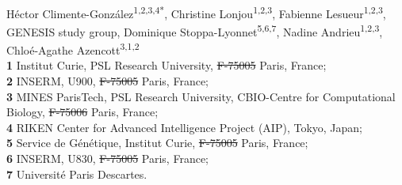 \documentclass[10pt,letterpaper]{article}
\providecommand{\DIFaddtex}[1]{{\protect\color{blue}\uwave{#1}}} %
\providecommand{\DIFdeltex}[1]{{\protect\color{red}\sout{#1}}}                      %
\providecommand{\DIFaddbegin}{} %
\providecommand{\DIFaddend}{} %
\providecommand{\DIFdelbegin}{} %
\providecommand{\DIFdelend}{} %
\providecommand{\DIFadd}[1]{\texorpdfstring{\DIFaddtex{#1}}{#1}} %
\providecommand{\DIFdel}[1]{\texorpdfstring{\DIFdeltex{#1}}{}} %
\newcommand{\DIFscaledelfig}{0.5}
\newlength{\DIFdelgraphicswidth} %
\newlength{\DIFdelgraphicsheight} %
\newcommand{\DIFaddincludegraphics}[2][]{{\color{blue}\fbox{\DIFOincludegraphics[#1]{#2}}}} %
\newcommand{\DIFdelincludegraphics}[2][]{%
\sbox{\DIFdelgraphicsbox}{\DIFOincludegraphics[#1]{#2}}%
\settoboxwidth{\DIFdelgraphicswidth}{\DIFdelgraphicsbox} %
\settoboxtotalheight{\DIFdelgraphicsheight}{\DIFdelgraphicsbox} %
\scalebox{\DIFscaledelfig}{%
\parbox[b]{\DIFdelgraphicswidth}{\usebox{\DIFdelgraphicsbox}\\[-\baselineskip] \rule{\DIFdelgraphicswidth}{0em}}\llap{\resizebox{\DIFdelgraphicswidth}{\DIFdelgraphicsheight}{%
\setlength{\unitlength}{\DIFdelgraphicswidth}%
\begin{picture}(1,1)%
\thicklines\linethickness{2pt} %
{\color[rgb]{1,0,0}\put(0,0){\framebox(1,1){}}}%
{\color[rgb]{1,0,0}\put(0,0){\line( 1,1){1}}}%
{\color[rgb]{1,0,0}\put(0,1){\line(1,-1){1}}}%
\end{picture}%
}\hspace*{3pt}}} %
} %
\DeclareRobustCommand{\DIFaddbegin}{\DIFOaddbegin \let\includegraphics\DIFaddincludegraphics} %
\DeclareRobustCommand{\DIFaddend}{\DIFOaddend \let\includegraphics\DIFOincludegraphics} %
\DeclareRobustCommand{\DIFdelbegin}{\DIFOdelbegin \let\includegraphics\DIFdelincludegraphics} %
\DeclareRobustCommand{\DIFdelend}{\DIFOaddend \let\includegraphics\DIFOincludegraphics} %
\begin{document}
\vspace*{0.2in}

\begin{flushleft}
{\Large
\textbf{} %
}
\newline
\\
Héctor Climente-González\textsuperscript{1,2,3,4*}, 
Christine Lonjou\textsuperscript{1,2,3}, 
Fabienne Lesueur\textsuperscript{1,2,3},
GENESIS study group\textsuperscript{\textpilcrow},
Dominique Stoppa-Lyonnet\textsuperscript{5,6,7\textcurrency}, 
Nadine Andrieu\textsuperscript{1,2,3}, 
Chloé-Agathe Azencott\textsuperscript{3,1,2}
\\
\bigskip
\textbf{1} Institut Curie, PSL Research University, \DIFdelbegin \DIFdel{F-75005 }\DIFdelend Paris, France;\\
\textbf{2} INSERM, U900, \DIFdelbegin \DIFdel{F-75005 }\DIFdelend Paris, France;\\
\textbf{3} MINES ParisTech, PSL Research University, CBIO-Centre for Computational Biology, \DIFdelbegin \DIFdel{F-75006 }\DIFdelend Paris, France;\\
\textbf{4} RIKEN Center for Advanced Intelligence Project (AIP), Tokyo, Japan; \\
\textbf{5} Service de Génétique, Institut Curie, \DIFdelbegin \DIFdel{F-75005 }\DIFdelend Paris, France;\\
\textbf{6} INSERM, U830, \DIFdelbegin \DIFdel{F-75005 }\DIFdelend Paris, France;\\
\textbf{7} Université Paris Descartes\DIFaddbegin \DIFadd{, Paris, France}\DIFaddend .\\
\bigskip

% 
%



\end{flushleft}
\end{document}
